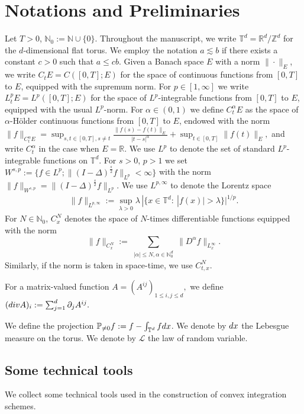 \documentclass[10pt,a4paper]{amsart}
\numberwithin{equation}{section}
\def\dif{{\mathord{{\rm d}}}}
\def\mN{{\mathbb N}}
\def\mR{{\mathbb R}}
\def\mT{{\mathbb T}}
\def\mZ{{\mathbb Z}}
\def\leq{\leqslant}
\def\div{\mathord{{\rm div}}}
\def\dif{{\mathord{{\rm d}}}}
\def\leq{\leqslant}
\def\div{\mathord{{\rm div}}}
\def\N{\mathbb N} \def\kk{\zeta} \def\m{{\bf m}}
\begin{document}
\section{Notations and Preliminaries}\label{sec:notation}
 Let $T>0$, $\mN_{0}:=\mN\cup \{0\}$. Throughout the manuscript, we write  $\mT^d = \mR^d/\mZ^d$ for the $d$-dimensional flat torus.  
We employ the notation $a\lesssim b$ if there exists a constant $c>0$ such that $a\leq cb$. %
  Given a Banach space $E$ with a norm $\|\cdot\|_E$, we write $C_tE=C([0,T];E)$ for the space of continuous functions from $[0,T]$ to $E$, equipped with the supremum norm. For $p\in [1,\infty]$ we write $L^p_tE=L^p([0,T];E)$ for the space of $L^p$-integrable functions from $[0,T]$ to $E$, equipped with the usual $L^p$-norm.
For $\alpha\in(0,1)$ we  define $C^\alpha_tE$ as the space of $\alpha$-H\"{o}lder continuous functions from $[0,T]$ to $E$, endowed with the norm $\|f\|_{C^\alpha_tE}=\sup_{s,t\in[0,T],s\neq t}\frac{\|f(s)-f(t)\|_E}{|t-s|^\alpha}+\sup_{t\in[0,T]}\|f(t)\|_{E},$   and write  $C_t^\alpha$ in the case when $E=\mathbb{R}$. 
   We use $L^p$ to denote the set of  standard $L^p$-integrable functions on $\mathbb{T}^d$.
For $s>0$, $p>1$ we set $W^{s,p}:=\{f\in L^p; \|(I-\Delta)^{\frac{s}{2}}f\|_{L^p}<\infty\}$ with the norm  $\|f\|_{W^{s,p}}=\|(I-\Delta)^{\frac{s}{2}}f\|_{L^p}$.   We use $L^{p,\infty}$ to denote the Lorentz space
\begin{align*}
\|f\|_{L^{p,\infty}}
:=
\sup_{\lambda>0}
\lambda
\,|\{x\in\mathbb{T}^d:\ |f(x)|>\lambda\}|^{1/p}.
\end{align*}
For $N\in \N_0 $, $C_x^N$ denotes the space of $N$-times differentiable functions equipped with the norm
	$$
	\|f\|_{C_x^N}:=\sum_{\substack{|\alpha|\leq N, \alpha\in\N^{d}_{0} }}\| D^\alpha f\|_{ L^\infty_x}.$$ Similarly, if the norm is taken in space-time, we use $C^{N}_{t,x}$. %
  
   For a matrix-valued function
$
A=(A^{ij})_{1\leq i,j\leq d},
$
we define
$
(\div A)_i:=\sum_{j=1}^d\partial_jA^{ij}.
$

We define  the projection  $\mathbb{P}_{\neq0} f := f -\int_{\mathbb{T}^d} f\dif x$.
We denote by $\dif x$ the Lebesgue measure on the torus.
 We denote by $\mathcal{L}$ the law of  random variable.



\subsection{Some technical tools}\label{tamr}
We collect some technical tools used in the construction of convex integration schemes. 
\end{document}
